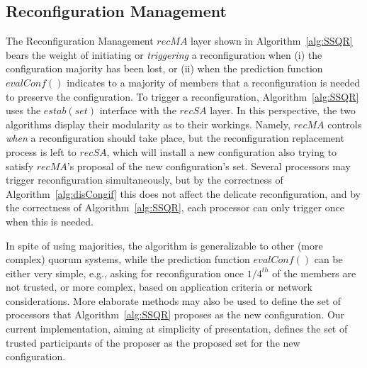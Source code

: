 \documentclass[11pt]{article}
\newcommand{\configEstab}{estab}
\begin{document}
\subsection{Reconfiguration Management}
\label{sec:reconMan}
The Reconfiguration Management $recMA$ layer shown in Algorithm~\ref{alg:SSQR} bears the weight of initiating or \emph{triggering} a reconfiguration when (i) the configuration majority has been lost, or (ii) when the prediction function $evalConf()$ indicates to a majority of members that a reconfiguration is needed to preserve the configuration.
To trigger a reconfiguration, Algorithm~\ref{alg:SSQR} uses the $\configEstab(set)$ interface with the $recSA$ layer.
In this perspective, the two algorithms display their modularity as to their workings.
Namely, $recMA$ controls \emph{when} a reconfiguration should take place, but the reconfiguration replacement process is left to $recSA$, which will install a new configuration also trying to satisfy $recMA$'s proposal of the new configuration's set.
Several processors may trigger reconfiguration simultaneously, but by the correctness of Algorithm~\ref{alg:disCongif} this does not affect the delicate reconfiguration, and by the correctness of Algorithm~\ref{alg:SSQR}, each processor can only trigger once when this is needed.

In spite of using majorities, the algorithm is generalizable to other (more complex) quorum systems, while the prediction function $evalConf()$ can be either very simple, e.g., asking for reconfiguration once $1/4^{th}$ of the members are not trusted, or more complex, based on application criteria or network considerations.
More elaborate methods may also be used to define the set of processors that Algorithm~\ref{alg:SSQR} proposes as the new configuration. Our current implementation, aiming at simplicity of presentation, defines the set of trusted participants of the proposer as the proposed set for the new configuration.
\end{document}
